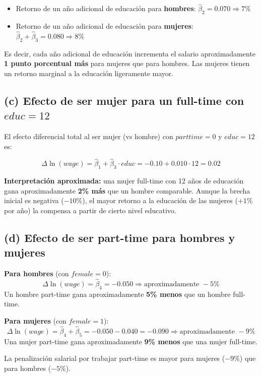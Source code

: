 \documentclass[10pt,a4paper]{article}
\begin{document}
\begin{enumerate}
\begin{itemize}[leftmargin=2em]
    \item Retorno de un año adicional de educación para \textbf{hombres}: \(\hat{\beta}_2 = 0.070 \Rightarrow 7\%\)
    \item Retorno de un año adicional de educación para \textbf{mujeres}: \(\hat{\beta}_2 + \hat{\beta}_3 = 0.080 \Rightarrow 8\%\)
\end{itemize}

Es decir, cada año adicional de educación incrementa el salario aproximadamente \textbf{1 punto porcentual más} para mujeres que para hombres. Las mujeres tienen un retorno marginal a la educación ligeramente mayor.

\subsection*{(c) Efecto de ser mujer para un full-time con \(educ=12\)}

El efecto diferencial total al ser mujer (vs hombre) con \(parttime=0\) y \(educ=12\) es:

\[
\Delta \ln(wage) = \hat{\beta}_1 + \hat{\beta}_3 \cdot educ = -0.10 + 0.010 \cdot 12 = 0.02
\]

\begin{conclusion}
\textbf{Interpretación aproximada:} una mujer full-time con 12 años de educación gana aproximadamente \textbf{2\% más} que un hombre comparable. Aunque la brecha inicial es negativa (\(-10\%\)), el mayor retorno a la educación de las mujeres (\(+1\%\) por año) la compensa a partir de cierto nivel educativo.
\end{conclusion}

\subsection*{(d) Efecto de ser part-time para hombres y mujeres}

\textbf{Para hombres} (con \(female=0\)):
\[
\Delta \ln(wage) = \hat{\beta}_4 = -0.050 \Rightarrow \text{aproximadamente } -5\%
\]
Un hombre part-time gana aproximadamente \textbf{5\% menos} que un hombre full-time.

\textbf{Para mujeres} (con \(female=1\)):
\[
\Delta \ln(wage) = \hat{\beta}_4 + \hat{\beta}_5 = -0.050 - 0.040 = -0.090 \Rightarrow \text{aproximadamente } -9\%
\]
Una mujer part-time gana aproximadamente \textbf{9\% menos} que una mujer full-time.

\begin{conclusion}
La penalización salarial por trabajar part-time es mayor para mujeres (\(-9\%\)) que para hombres (\(-5\%\)).
\end{conclusion}


\end{enumerate}
\end{document}
